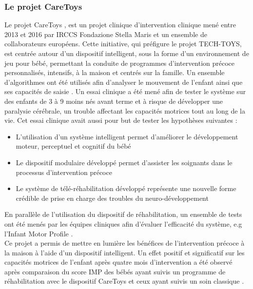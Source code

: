 \documentclass[5pt]{article}
\begin{document}
\subsubsection{Le projet CareToys}
\par Le projet CareToys \cite{noauthor_project_nodate}, \cite{cecchi_caretoy_2016} est un projet clinique d’intervention clinique mené entre 2013 et 2016 par IRCCS Fondazione Stella Maris et un ensemble de collaborateurs européens. Cette initiative, qui préfigure le projet TECH-TOYS, est centrée autour d’un dispositif intelligent, sous la forme d’un environnement de jeu pour bébé, permettant la conduite de programmes d’intervention précoce personnalisés, intensifs, à la maison et centrés sur la famille. Un ensemble d’algorithmes ont été utilisés afin d’analyser le mouvement de l’enfant \cite{rihar_infant_2014} ainsi que ses capacités de saisie \cite{del_maestro_sensing_2011}. Un essai clinique \cite{sgandurra_home-based_2014} a été mené afin de tester le système sur des enfants de 3 à 9 moins nés avant terme et à risque de développer une paralysie cérébrale, un trouble affectant les capacités motrices tout au long de la vie. Cet essai clinique avait aussi pour but de tester les hypothèses suivantes : \begin{itemize}
    \item L’utilisation d’un système intelligent permet d’améliorer le développement moteur, perceptuel et cognitif du bébé
    \item Le dispositif modulaire développé permet d’assister les soignants dans le processus d’intervention précoce
    \item Le système de télé-réhabilitation développé représente une nouvelle forme crédible de prise en charge des troubles du neuro-développement
\end{itemize} 
En parallèle de l’utilisation du dispositif de réhabilitation, un ensemble de tests ont été menés par les équipes cliniques afin d’évaluer l’efficacité du système, e.g l’Infant Motor Profile \cite{heineman_infant_2008}.\\
Ce projet a permis de mettre en lumière les bénéfices de l’intervention précoce à la maison à l’aide d’un dispositif intelligent. Un effet positif et significatif sur les capacités motrices de l’enfant après quatre mois d’intervention a été observé après comparaison du score IMP des bébés ayant suivis un programme de réhabilitation avec le dispositif CareToys et ceux ayant suivis un soin classique \cite{sgandurra_effects_2019}.
\end{document}
